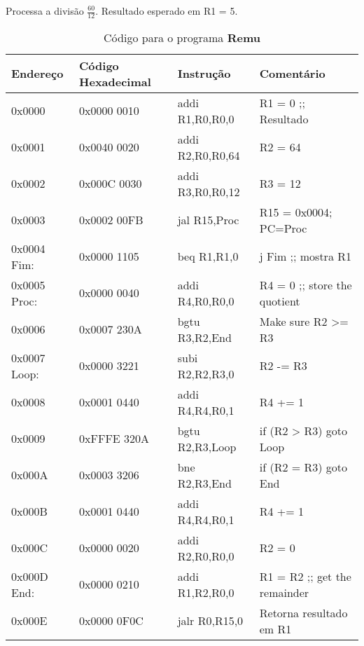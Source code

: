 \documentclass[12pt]{article}
\begin{document}
Processa a divisão $\frac{60}{12}$. Resultado esperado em R1 = 5.

\begin{table}[H]
    \centering
    \caption{Código para o programa \textbf{Remu}}
    \begin{tabular}{|l|l|l|l|}\hline
        \textbf{Endereço} & \textbf{Código Hexadecimal} & \textbf{Instrução} & \textbf{Comentário} \\\hline
        0x0000       & 0x0000 0010 & addi R1,R0,R0,0  & R1 = 0 ;; Resultado           \\\hline
        0x0001       & 0x0040 0020 & addi R2,R0,R0,64 & R2 = 64                       \\\hline
        0x0002       & 0x000C 0030 & addi R3,R0,R0,12 & R3 = 12                       \\\hline
        0x0003       & 0x0002 00FB & jal R15,Proc     & R15 = 0x0004; PC=Proc         \\\hline
        0x0004 Fim:  & 0x0000 1105 & beq R1,R1,0      & j Fim ;; mostra R1            \\\hline
        0x0005 Proc: & 0x0000 0040 & addi R4,R0,R0,0  & R4 = 0 ;; store the quotient  \\\hline
        0x0006       & 0x0007 230A & bgtu R3,R2,End   & Make sure R2 >= R3            \\\hline
        0x0007 Loop: & 0x0000 3221 & subi R2,R2,R3,0  & R2 -= R3                      \\\hline
        0x0008       & 0x0001 0440 & addi R4,R4,R0,1  & R4 += 1                       \\\hline
        0x0009       & 0xFFFE 320A & bgtu R2,R3,Loop  & if (R2 > R3) goto Loop        \\\hline
        0x000A       & 0x0003 3206 & bne  R2,R3,End   & if (R2 \!= R3) goto End       \\\hline
        0x000B       & 0x0001 0440 & addi R4,R4,R0,1  & R4 += 1                       \\\hline
        0x000C       & 0x0000 0020 & addi R2,R0,R0,0  & R2 = 0                        \\\hline
        0x000D End:  & 0x0000 0210 & addi R1,R2,R0,0  & R1 = R2 ;; get the remainder  \\\hline
        0x000E       & 0x0000 0F0C & jalr R0,R15,0    & Retorna resultado em R1       \\\hline
    \end{tabular}\label{tab:programs:remu}
\end{table}
\end{document}
